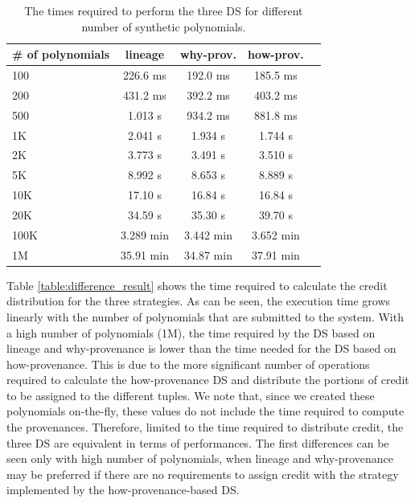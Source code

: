 \begin{table}[hbt]
\centering
  \begin{tabular}{| l |c | c | c | c ||}
  \hline
    \# of polynomials  & lineage & why-prov. & how-prov. \\
    \hline
    100 & 226.6 ms & 192.0 ms & 185.5 ms \\
    200 & 431.2 ms & 392.2 ms & 403.2 ms \\
    500 & 1.013 s  & 934.2 ms & 881.8 ms \\ 
    1K  & 2.041 s  & 1.934 s  & 1.744 s  \\
    2K  & 3.773 s  & 3.491 s  & 3.510 s  \\
    5K  & 8.992 s  & 8.653 s  & 8.889 s  \\
    10K & 17.10 s  & 16.84 s  & 16.84 s  \\
    20K & 34.59 s  & 35.30 s  & 39.70 s \\
    100K & 3.289 min & 3.442 min & 3.652 min \\
    1M  & 35.91 min & 34.87 min & 37.91 min \\
    \hline
  \end{tabular}
  \caption{The times required to perform the three DS for different number of synthetic polynomials.}
  \label{table:times}
\end{table}

Table \ref{table:difference_result} shows the time required to calculate the credit distribution for the three strategies. As can be seen, the execution time grows linearly with the number of polynomials that are submitted to the system. With a high number of polynomials (1M), the time required by the DS based on lineage and why-provenance is lower than the time needed for the DS based on how-provenance. This is due to the more significant number of operations required to calculate the how-provenance DS  and distribute the portions of credit to be assigned to the different tuples. 
We note that, since we created these polynomials on-the-fly, these values do not include the time required to compute the provenances.
Therefore, limited to the time required to distribute credit, the three DS are equivalent in terms of performances. The first differences can be seen only with high number of polynomials, when lineage and why-provenance may be preferred if there are no requirements to assign credit with the strategy implemented by the how-provenance-based DS.

